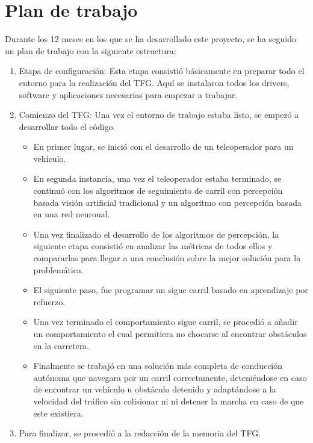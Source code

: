 \section{Plan de trabajo}
\label{sec:plantrabajo}

Durante los 12 meses en los que se ha desarrollado este proyecto, se ha seguido un plan de trabajo con la siguiente estructura:
\begin{enumerate}
	\item Etapa de configuración: Esta etapa consistió básicamente en preparar todo el entorno para la realización del \ac{TFG}. Aquí se instalaron todos los drivers, software y aplicaciones necesarias para empezar a trabajar.
	\item Comienzo del \ac{TFG}: Una vez el entorno de trabajo estaba listo, se empezó a desarrollar todo el código.
	\begin{itemize}
		\item En primer lugar, se inició con el desarrollo de un teleoperador para un vehículo.
		\item En segunda instancia, una vez el teleoperador estaba terminado, se continuó con los algoritmos de seguimiento de carril con percepción basada visión artificial tradicional y un algoritmo con percepción basada en una red neuronal.
		\item Una vez finalizado el desarrollo de los algoritmos de percepción, la siguiente etapa consistió en analizar las métricas de todos ellos y compararlas para llegar a una conclusión sobre la mejor solución para la problemática.
		\item El siguiente paso, fue programar un sigue carril basado en aprendizaje por refuerzo.
		\item Una vez terminado el comportamiento sigue carril, se procedió a añadir un comportamiento el cual permitiera no chocarse al encontrar obstáculos en la carretera.
		\item Finalmente se trabajó en una solución más completa de conducción autónoma que navegara por un carril correctamente, deteniéndose en caso de encontrar un vehículo u obstáculo detenido y adaptándose a la velocidad del tráfico sin colisionar ni ni detener la marcha en caso de que este existiera.
	\end{itemize}
	\item Para finalizar, se procedió a la redacción de la memoria del \ac{TFG}.
\end{enumerate}

